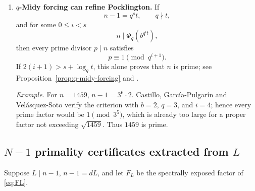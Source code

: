 \documentclass[11pt]{article}
\newcommand{\ord}{\operatorname{ord}}
\begin{document}
\begin{enumerate}[label=\textbf{T\arabic*.},leftmargin=2.2em,resume]
\smallskip
\noindent\emph{Example.}
\[
2047=23\cdot89,\qquad
\ord_{23}(2)=\ord_{89}(2)=\ord_{2047}(2)=11.
\]
The two prime checks already prove that $2047$ is total Midy, hence an
overpseudoprime, to base $2$.

\item \textbf{$q$-Midy forcing can refine Pocklington.}
If
\[
n-1=q^s t,\qquad q\nmid t,
\]
and for some $0\le i<s$
\[
n\mid\Phi_q\!\left(b^{q^i t}\right),
\]
then every prime divisor $p\mid n$ satisfies
\[
p\equiv1\pmod{q^{i+1}}.
\]
If $2(i+1)>s+\log_q t$, this alone proves that $n$ is prime; see
Proposition~\ref{prop:q-midy-forcing} and \cite{Castillo2015}.

\smallskip
\noindent\emph{Example.}
For $n=1459$, $n-1=3^6\cdot2$.  Castillo, Garc\'ia-Pulgar\'in and
Vel\'asquez-Soto verify the criterion with $b=2$, $q=3$, and $i=4$; hence
every prime factor would be $1\pmod{3^5}$, which is already too large for a
proper factor not exceeding $\sqrt{1459}$.  Thus $1459$ is prime.
\end{enumerate}

\subsection{$N-1$ primality certificates extracted from $L$}

Suppose $L\mid n-1$, $n-1=dL$, and let $F_L$ be the spectrally exposed
factor of \eqref{eq:FL}.
\end{document}
